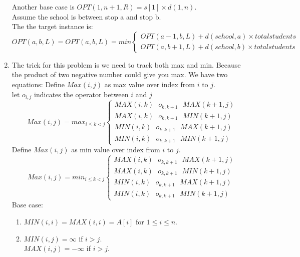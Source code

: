 \documentclass{article}
\begin{document}
\begin{enumerate}
Another base case is $OPT(1,n+1,R) = s[1] \times d(1,n)$.\\
Assume the school is between stop a and stop b. \\
The the target instance is:
\begin{equation}
OPT(a,b,L) = OPT(a,b,L) = min
\begin{cases}
OPT(a-1, b, L) + d(school, a) \times total students \\
OPT(a, b+1, L) + d(school, b) \times total students 
\end{cases}
\end{equation}

\item 
The trick for this problem is we need to track both max and min. Because the product of two negative number could give you max.
We have two equations:
Define $Max(i,j)$ as max value over index from $i$ to $j$.\\
let $o_{i,j}$ indicates the operator between $i$ and $j$\\
\begin{equation}
Max(i,j) = max_{i \leqslant k < j}
\begin{cases}
MAX(i,k) \text{ } o_{k,k+1} \text{ } MAX(k+1,j) \\
MAX(i,k) \text{ } o_{k,k+1} \text{ } MIN(k+1,j) \\
MIN(i,k) \text{ } o_{k,k+1} \text{ } MAX(k+1,j) \\
MIN(i,k) \text{ } o_{k,k+1} \text{ } MIN(k+1,j)
\end{cases}			
\end{equation}
Define $Max(i,j)$ as min value over index from $i$ to $j$.\\
\begin{equation}
Max(i,j) = min_{i \leqslant k < j}
\begin{cases}
MAX(i,k) \text{ } o_{k,k+1} \text{ } MAX(k+1,j) \\
MAX(i,k) \text{ } o_{k,k+1} \text{ } MIN(k+1,j) \\
MIN(i,k) \text{ } o_{k,k+1} \text{ } MAX(k+1,j) \\
MIN(i,k) \text{ } o_{k,k+1} \text{ } MIN(k+1,j)
\end{cases}			
\end{equation}
Base case: 
\begin{enumerate}
\item $MIN(i,i) = MAX(i,i) = A[i]$ for $1 \leqslant i \leqslant n$.\\
\item $MIN(i,j) = \infty$ if $i>j$. \\
$MAX(i,j) = -\infty$ if $i>j$.\\
\end{enumerate}


\end{enumerate}
\end{document}
